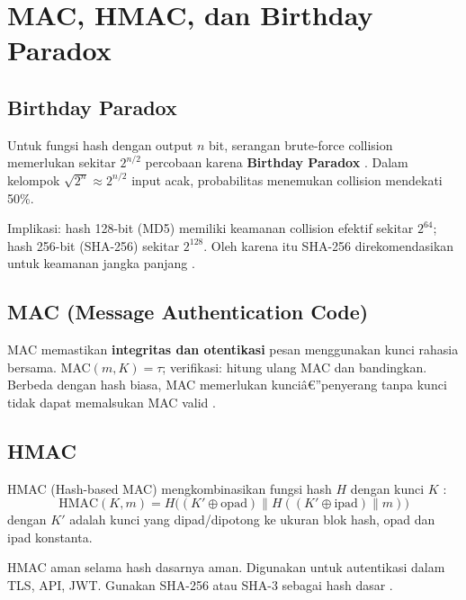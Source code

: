 ﻿\section{MAC, HMAC, dan Birthday Paradox}

\subsection{Birthday Paradox}

Untuk fungsi hash dengan output $n$ bit, serangan brute-force collision memerlukan sekitar $2^{n/2}$ percobaan karena \textbf{Birthday Paradox} \cite{stallings2017}. Dalam kelompok $\sqrt{2^n} \approx 2^{n/2}$ input acak, probabilitas menemukan collision mendekati 50\%.

Implikasi: hash 128-bit (MD5) memiliki keamanan collision efektif sekitar $2^{64}$; hash 256-bit (SHA-256) sekitar $2^{128}$. Oleh karena itu SHA-256 direkomendasikan untuk keamanan jangka panjang \cite{menezes1996}.

\subsection{MAC (Message Authentication Code)}

MAC memastikan \textbf{integritas dan otentikasi} pesan menggunakan kunci rahasia bersama. MAC$(m, K) = \tau$; verifikasi: hitung ulang MAC dan bandingkan. Berbeda dengan hash biasa, MAC memerlukan kunciâ€”penyerang tanpa kunci tidak dapat memalsukan MAC valid \cite{stallings2017}.

\subsection{HMAC}

HMAC (Hash-based MAC) mengkombinasikan fungsi hash $H$ dengan kunci $K$ \cite{stallings2017}:
\[
\text{HMAC}(K, m) = H\bigl( (K' \oplus \text{opad}) \| H( (K' \oplus \text{ipad}) \| m ) \bigr)
\]
dengan $K'$ adalah kunci yang dipad/dipotong ke ukuran blok hash, opad dan ipad konstanta.

HMAC aman selama hash dasarnya aman. Digunakan untuk autentikasi dalam TLS, API, JWT. Gunakan SHA-256 atau SHA-3 sebagai hash dasar \cite{menezes1996}.
